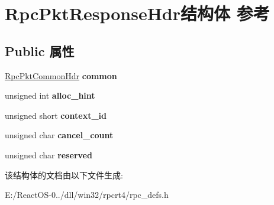 \hypertarget{struct_rpc_pkt_response_hdr}{}\section{Rpc\+Pkt\+Response\+Hdr结构体 参考}
\label{struct_rpc_pkt_response_hdr}
\subsection*{Public 属性}
\begin{DoxyCompactItemize}
\item 
\mbox{\label{struct_rpc_pkt_response_hdr_a23e4c3ea218486a27e2a1b50c7228b33}} 
\hyperlink{struct_rpc_pkt_common_hdr}{Rpc\+Pkt\+Common\+Hdr} {\bfseries common}
\item 
\mbox{\label{struct_rpc_pkt_response_hdr_a2e895875cbee362c620d079194848d58}} 
unsigned int {\bfseries alloc\+\_\+hint}
\item 
\mbox{\label{struct_rpc_pkt_response_hdr_a9f9803706e89fbadca6343ea1797f482}} 
unsigned short {\bfseries context\+\_\+id}
\item 
\mbox{\label{struct_rpc_pkt_response_hdr_a4afb2c77d7fbe3eb4444909831969fa2}} 
unsigned char {\bfseries cancel\+\_\+count}
\item 
\mbox{\label{struct_rpc_pkt_response_hdr_aaaad062012d8c8161d258cd1cd137d55}} 
unsigned char {\bfseries reserved}
\end{DoxyCompactItemize}


该结构体的文档由以下文件生成\+:\begin{DoxyCompactItemize}
\item 
E\+:/\+React\+O\+S-\/0../dll/win32/rpcrt4/rpc\+\_\+defs.\+h\end{DoxyCompactItemize}
